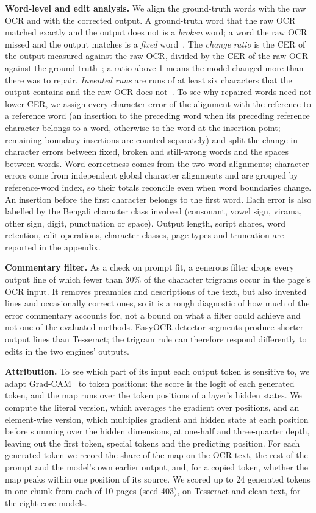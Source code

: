\documentclass[conference]{IEEEtran}
\begin{document}
\textbf{Word-level and edit analysis.} We align the ground-truth words with the raw OCR and with the corrected output. A ground-truth word that the raw OCR matched exactly and the output does not is a \emph{broken} word; a word the raw OCR missed and the output matches is a \emph{fixed} word~\cite{kumar2026postasr}. The \emph{change ratio} is the CER of the output measured against the raw OCR, divided by the CER of the raw OCR against the ground truth~\cite{koynov2025opportunities}; a ratio above 1 means the model changed more than there was to repair. \emph{Invented runs} are runs of at least six characters that the output contains and the raw OCR does not~\cite{koynov2025opportunities}. To see why repaired words need not lower CER, we assign every character error of the alignment with the reference to a reference word (an insertion to the preceding word when its preceding reference character belongs to a word, otherwise to the word at the insertion point; remaining boundary insertions are counted separately) and split the change in character errors between fixed, broken and still-wrong words and the spaces between words. Word correctness comes from the two word alignments; character errors come from independent global character alignments and are grouped by reference-word index, so their totals reconcile even when word boundaries change. An insertion before the first character belongs to the first word. Each error is also labelled by the Bengali character class involved (consonant, vowel sign, virama, other sign, digit, punctuation or space). Output length, script shares, word retention, edit operations, character classes, page types and truncation are reported in the appendix.

\textbf{Commentary filter.} As a check on prompt fit, a generous filter drops every output line of which fewer than 30\% of the character trigrams occur in the page's OCR input. It removes preambles and descriptions of the text, but also invented lines and occasionally correct ones, so it is a rough diagnostic of how much of the error commentary accounts for, not a bound on what a filter could achieve and not one of the evaluated methods. EasyOCR detector segments produce shorter output lines than Tesseract; the trigram rule can therefore respond differently to edits in the two engines' outputs.

\textbf{Attribution.} To see which part of its input each output token is sensitive to, we adapt Grad-CAM~\cite{selvaraju2017gradcam} to token positions: the score is the logit of each generated token, and the map runs over the token positions of a layer's hidden states. We compute the literal version, which averages the gradient over positions, and an element-wise version, which multiplies gradient and hidden state at each position before summing over the hidden dimensions, at one-half and three-quarter depth, leaving out the first token, special tokens and the predicting position. For each generated token we record the share of the map on the OCR text, the rest of the prompt and the model's own earlier output, and, for a copied token, whether the map peaks within one position of its source. We scored up to 24 generated tokens in one chunk from each of 10 pages (seed 403), on Tesseract and clean text, for the eight core models.
\end{document}
